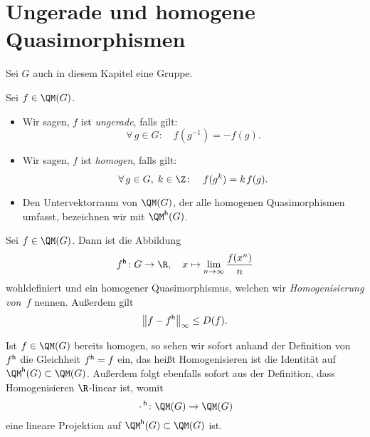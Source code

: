 \chapter{Ungerade und homogene Quasimorphismen} \label{homo}
\begin{thSetup}
    Sei $G$ auch in diesem Kapitel eine Gruppe.
\end{thSetup}

\begin{thDef}
    Sei $f\in\QM(G)$.
    \begin{itemize}
        \item
            Wir sagen, $f$ ist \emph{ungerade}, falls gilt:
            \[ \forall\,g\in G\colon\quad
                f(g^{-1}) = -f(g)
            . \]
            
        \item
            Wir sagen, $f$ ist \emph{homogen}, falls gilt:
            \[ \forall\,g\in G,\;k\in\Z\colon\quad
                f(g^k) = k \mkern2mu f(g)
            . \]
            
        \item
            Den Untervektorraum von $\QM(G)$, der alle homogenen Quasimorphismen
            umfasst, bezeichnen wir mit $\QM\homo(G)$.
    \end{itemize}
\end{thDef}

\begin{thProposition}[Homogenisierung]
    \label{homo:homo}%
    Sei $f\in\QM(G)$. Dann ist die Abbildung
    \[ f\homo \colon G \to \R, \quad
        x\mapsto \lim_{n\to\infty} \frac{f(x^n)}{n}
    \]
    wohldefiniert und ein homogener Quasimorphismus, welchen wir
    \emph{Homogenisierung von~$f$} nennen. Außerdem gilt
    \[ \norm[\big]{f-f\homo}_\supr \leq D(f)  . \]
\end{thProposition}

\begin{thBemerkung} \label{homo:homoisproj}
    Ist $f\in\QM(G)$ bereits homogen, so sehen wir sofort anhand der Definition
    von $f\homo$ die Gleichheit $f\homo = f$ ein, das heißt Homogenisieren ist die
    Identität auf $\QM\homo(G) \subset \QM(G)$. Außerdem folgt ebenfalls sofort
    aus der Definition, dass Homogenisieren $\R$-linear ist, womit
    \[ {\scdot}\homo\colon \QM(G) \to \QM(G) \]
    eine lineare Projektion auf $\QM\homo(G) \subset \QM(G)$ ist.
\end{thBemerkung}

